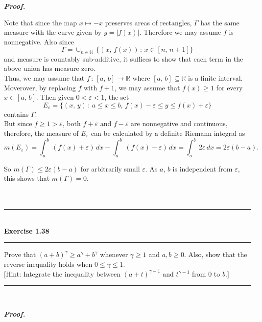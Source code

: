 \documentclass[a4paper,11pt]{article}
\begin{document}
\textbf{\textit{Proof.}}

Note that since the map $x \mapsto -x$ preserves areas of rectangles, $\Gamma$ has the same measure with the curve given by $y = |f(x)|$. Therefore we may assume $f$ is nonnegative. Also since
	$$\Gamma = \cup_{n \in \mathbb{N}}\,\{(x,\,f(x))\,:\,x\in[n,\,n+1]\}$$
and measure is countably sub-additive, it suffices to show that each term in the above union has measure zero.\\

Thus, we may assume that $f\,:\,[a,\,b] \to \mathbb{R}$ where $[a,\,b] \subseteq \mathbb{R}$ is a finite interval. Moverover, by replacing $f$ with $f + 1$, we may assume that $f(x) \geq 1$ for every $x \in [a,\,b]$. Then given $0 < \varepsilon < 1$, the set
	$$E_\varepsilon = \{(x,\,y)\,:\,a \leq x \leq b,\,f(x) - \varepsilon \leq y \leq f(x) + \varepsilon\}$$
contains $\Gamma$.\\

But since $f \geq 1 > \varepsilon$, both $f + \varepsilon$ and $f - \varepsilon$ are nonnegative and continuous, therefore, the measure of $E_\varepsilon$ can be calculated by a definite Riemann integral as
	$$m(E_\varepsilon)
	= \int_a^b\,(f(x) + \varepsilon)\,dx - \int_a^b\,(f(x) - \varepsilon)\,dx
	= \int_a^b\,2\varepsilon\,dx
	= 2\varepsilon(b - a).$$

So $m(\Gamma) \leq 2\varepsilon(b - a)$ for arbitrarily small $\varepsilon$. As $a,\,b$ is independent from $\varepsilon$, this shows that $m(\Gamma) = 0$.\\\\\\



\begin{flushleft}
	\rule[-0.5ex]{17cm}{2pt}\\
		\textbf{Exercise 1.38}\\
	\rule[1.5ex]{17cm}{0.5pt}
		Prove that $(a + b)^\gamma \geq a^\gamma + b^\gamma$ whenever $\gamma \geq 1$ and $a, b \geq 0$. Also, show that the reverse inequality holds when $0 \leq \gamma \leq 1$.\\

		$[$Hint: Integrate the inequality between $(a + t)^{\gamma - 1}$ and $t^{\gamma - 1}$ from $0$ to $b.]$
	\rule[1.0ex]{17cm}{0.5pt}\
\end{flushleft}

\textbf{\textit{Proof.}}
\end{document}
